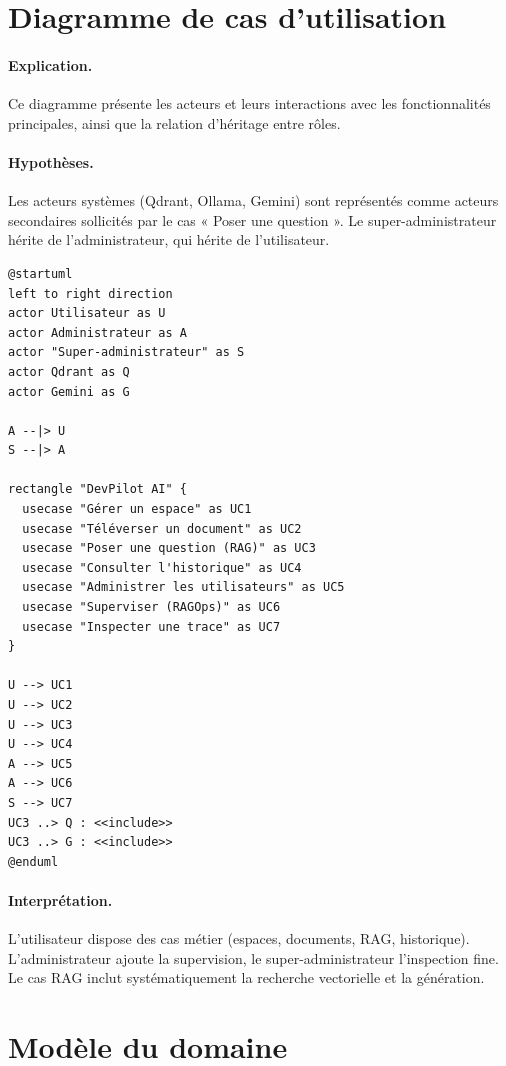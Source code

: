 \section{Diagramme de cas d'utilisation}
\paragraph{Explication.} Ce diagramme présente les acteurs et leurs interactions
avec les fonctionnalités principales, ainsi que la relation d'héritage entre rôles.
\paragraph{Hypothèses.} Les acteurs systèmes (Qdrant, Ollama, Gemini) sont
représentés comme acteurs secondaires sollicités par le cas « Poser une question ».
Le super-administrateur hérite de l'administrateur, qui hérite de l'utilisateur.

\begin{lstlisting}[style=plantuml,caption={Diagramme de cas d'utilisation},label={lst:uc}]
@startuml
left to right direction
actor Utilisateur as U
actor Administrateur as A
actor "Super-administrateur" as S
actor Qdrant as Q
actor Gemini as G

A --|> U
S --|> A

rectangle "DevPilot AI" {
  usecase "Gérer un espace" as UC1
  usecase "Téléverser un document" as UC2
  usecase "Poser une question (RAG)" as UC3
  usecase "Consulter l'historique" as UC4
  usecase "Administrer les utilisateurs" as UC5
  usecase "Superviser (RAGOps)" as UC6
  usecase "Inspecter une trace" as UC7
}

U --> UC1
U --> UC2
U --> UC3
U --> UC4
A --> UC5
A --> UC6
S --> UC7
UC3 ..> Q : <<include>>
UC3 ..> G : <<include>>
@enduml
\end{lstlisting}

\paragraph{Interprétation.} L'utilisateur dispose des cas métier (espaces,
documents, RAG, historique). L'administrateur ajoute la supervision, le
super-administrateur l'inspection fine. Le cas RAG inclut systématiquement la
recherche vectorielle et la génération.

\section{Modèle du domaine}
